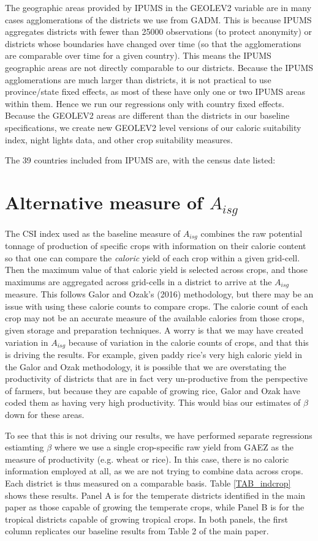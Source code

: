 \documentclass[11pt]{article}
\begin{document}
The geographic areas provided by IPUMS in the GEOLEV2 variable are in many cases agglomerations of the districts we use from GADM. This is because IPUMS aggregates districts with fewer than 25000 observations (to protect anonymity) or districts whose boundaries have changed over time (so that the agglomerations are comparable over time for a given country). This means the IPUMS geographic areas are not directly comparable to our districts. Because the IPUMS agglomerations are much larger than districts, it is not practical to use province/state fixed effects, as most of these have only one or two IPUMS areas within them. Hence we run our regressions only with country fixed effects. Because the GEOLEV2 areas are different than the districts in our baseline specifications, we create new GEOLEV2 level versions of our caloric suitability index, night lights data, and other crop suitability measures. 

The 39 countries included from IPUMS are, with the census date listed: 
 

\section{Alternative measure of $A_{isg}$}
The CSI index used as the baseline measure of $A_{isg}$ combines the raw potential tonnage of production of specific crops with information on their calorie content so that one can compare the \textit{caloric} yield of each crop within a given grid-cell. Then the maximum value of that caloric yield is selected across crops, and those maximums are aggregated across grid-cells in a district to arrive at the $A_{isg}$ measure. This follows Galor and Ozak's (2016) methodology, but there may be an issue with using these calorie counts to compare crops. The calorie count of each crop may not be an accurate measure of the available calories from those crops, given storage and preparation techniques. A worry is that we may have created variation in $A_{isg}$ because of variation in the calorie counts of crops, and that this is driving the results. For example, given paddy rice's very high caloric yield in the Galor and Ozak methodology, it is possible that we are overstating the productivity of districts that are in fact very un-productive from the perspective of farmers, but because they are capable of growing rice, Galor and Ozak have coded them as having very high productivity. This would bias our estimates of $\beta$ down for these areas. 

To see that this is not driving our results, we have performed separate regressions estiamting $\beta$ where we use a single crop-specific raw yield from GAEZ as the measure of productivity (e.g. wheat or rice). In this case, there is no caloric information employed at all, as we are not trying to combine data across crops. Each district is thus measured on a comparable basis. Table \ref{TAB_indcrop} shows these results. Panel A is for the temperate districts identified in the main paper as those capable of growing the temperate crops, while Panel B is for the tropical districts capable of growing tropical crops. In both panels, the first column replicates our baseline results from Table 2 of the main paper.
\end{document}
